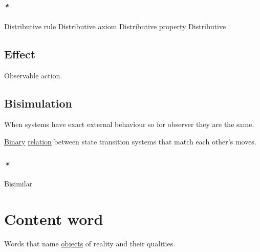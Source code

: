\documentclass[a4paper,14pt,oneside]{book}
\begin{document}
\paragraph{\emph{*}}
\label{sec:org937cb8e}

\label{org565d118}Distributive rule
\label{orgb5d7914}Distributive axiom
\label{org75fd5f0}Distributive property
\label{orga95862a}Distributive

\subsection{\label{org42742fe}Effect}
\label{sec:orgb346d21}
Observable action.

\subsection{\label{orgf41b87b}Bisimulation}
\label{sec:org24a19cc}
When systems have exact external behaviour so for observer they are the same.

\hyperref[org238f496]{Binary} \hyperref[org763b476]{relation} between state transition systems that match each other's moves.

\subsubsection{\emph{*}}
\label{sec:org1e0f6c0}

\label{org82702fc}Bisimilar

\section{\label{orged65690}Content word}
\label{sec:org09c2b72}
Words that name \hyperref[org79bef3b]{objects} of reality and their qualities.
\end{document}
